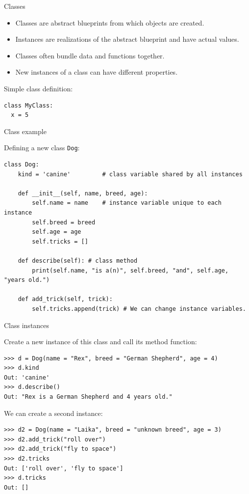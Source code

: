 \documentclass[compress%
,aspectratio=169%
]{beamer}
\newcommand{\code}{\lstinline}
\begin{document}
\begin{frame}[fragile]{Classes}

\begin{itemize}
    \item Classes are abstract blueprints from which objects are created.
    \item Instances are realizations of the abstract blueprint and have actual values.
    \item Classes often bundle data and functions together.
    \item New instances of a class can have different properties.
\end{itemize}
Simple class definition:

\begin{lstlisting}
class MyClass:
  x = 5

\end{lstlisting}
\end{frame}

\begin{frame}[fragile]{Class example}

Defining a new class \code|Dog|:
\begin{lstlisting}
class Dog:
    kind = 'canine'         # class variable shared by all instances

    def __init__(self, name, breed, age):
        self.name = name    # instance variable unique to each instance
        self.breed = breed
        self.age = age
        self.tricks = []
        
    def describe(self): # class method
        print(self.name, "is a(n)", self.breed, "and", self.age, "years old.")

    def add_trick(self, trick):
        self.tricks.append(trick) # We can change instance variables.
\end{lstlisting}
\end{frame}

\begin{frame}[fragile]{Class instances}
    
Create a new instance of this class and call its method function:
\begin{lstlisting}
>>> d = Dog(name = "Rex", breed = "German Shepherd", age = 4)
>>> d.kind
Out: 'canine'
>>> d.describe()
Out: "Rex is a German Shepherd and 4 years old."
\end{lstlisting}
We can create a second instance:

\begin{lstlisting}
>>> d2 = Dog(name = "Laika", breed = "unknown breed", age = 3)
>>> d2.add_trick("roll over")
>>> d2.add_trick("fly to space")
>>> d2.tricks
Out: ['roll over', 'fly to space']
>>> d.tricks
Out: [] 
\end{lstlisting}

\end{frame}
\end{document}
